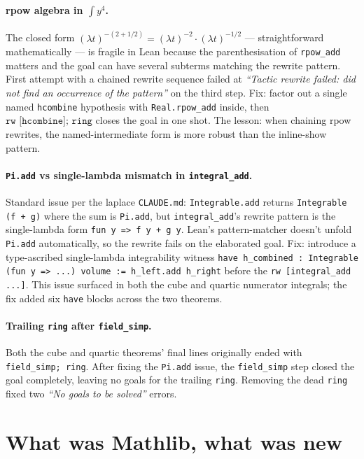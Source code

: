 \documentclass[11pt]{article}
\begin{document}
\paragraph{rpow algebra in $\int y^4$.} The closed form $(\lambda t)^{-(2 +
1/2)} = (\lambda t)^{-2} \cdot (\lambda t)^{-1/2}$ — straightforward
mathematically — is fragile in Lean because the parenthesisation of
\texttt{rpow\_add} matters and the goal can have several subterms
matching the rewrite pattern. First attempt with a chained rewrite
sequence failed at \emph{``Tactic rewrite failed: did not find an
occurrence of the pattern''} on the third step. Fix: factor out a
single named \texttt{hcombine} hypothesis with \texttt{Real.rpow\_add}
inside, then $\texttt{rw [hcombine]; ring}$ closes the goal in one
shot. The lesson: when chaining rpow rewrites, the named-intermediate
form is more robust than the inline-show pattern.

\paragraph{\texttt{Pi.add} vs single-lambda mismatch in
\texttt{integral\_add}.} Standard issue per the laplace
\texttt{CLAUDE.md}: \texttt{Integrable.add} returns
\texttt{Integrable (f + g)} where the sum is \texttt{Pi.add}, but
\texttt{integral\_add}'s rewrite pattern is the single-lambda form
\texttt{fun~y =>~f y + g y}. Lean's pattern-matcher doesn't unfold
\texttt{Pi.add} automatically, so the rewrite fails on the elaborated
goal. Fix: introduce a type-ascribed single-lambda integrability
witness \texttt{have h\_combined : Integrable (fun y => ...) volume :=
h\_left.add h\_right} before the \texttt{rw [integral\_add ...]}. This
issue surfaced in both the cube and quartic numerator integrals; the
fix added six \texttt{have} blocks across the two theorems.

\paragraph{Trailing \texttt{ring} after \texttt{field\_simp}.} Both
the cube and quartic theorems' final lines originally ended with
\texttt{field\_simp; ring}. After fixing the \texttt{Pi.add} issue, the
\texttt{field\_simp} step closed the goal completely, leaving no
goals for the trailing \texttt{ring}. Removing the dead \texttt{ring}
fixed two \emph{``No goals to be solved''} errors.

\section{What was Mathlib, what was new}
\end{document}
